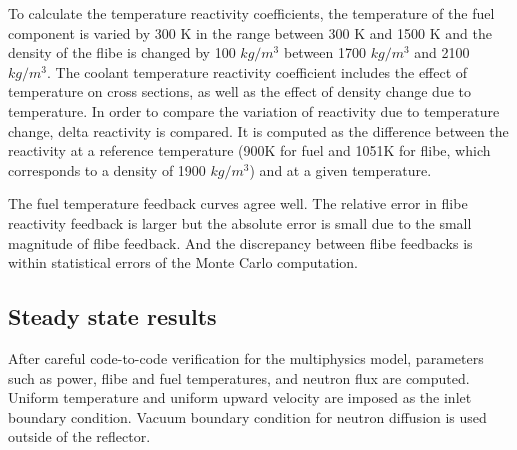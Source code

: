 \documentclass{elsarticle}
\begin{document}
To calculate the temperature reactivity coefficients, the temperature of the fuel component is varied by 300 K in the range between 300 K and 1500 K and the density of the flibe is changed by 100 $kg/m^3$ between 1700 $kg/m^3$ and 2100 $kg/m^3$. The coolant temperature reactivity coefficient includes the effect of temperature on cross sections, as well as the effect of density change due to temperature. 
In order to compare the variation of reactivity due to temperature change, delta reactivity is compared. It is computed as the difference between the reactivity at a reference temperature (900K for fuel and 1051K for flibe, which corresponds to a density of 1900 $kg/m^3$) and at a given temperature. 


The fuel temperature feedback curves agree well. 
The relative error in flibe reactivity feedback is larger but the absolute error is small due to the small magnitude of flibe feedback. And the discrepancy between flibe feedbacks is within statistical errors of the Monte Carlo computation. 


\subsection{Steady state results}
After careful code-to-code verification for the multiphysics model, parameters such as power, flibe and fuel temperatures, and neutron flux are computed. Uniform temperature and uniform upward velocity are imposed as the inlet boundary condition. Vacuum boundary condition for neutron diffusion is used outside of the reflector.  
\end{document}
